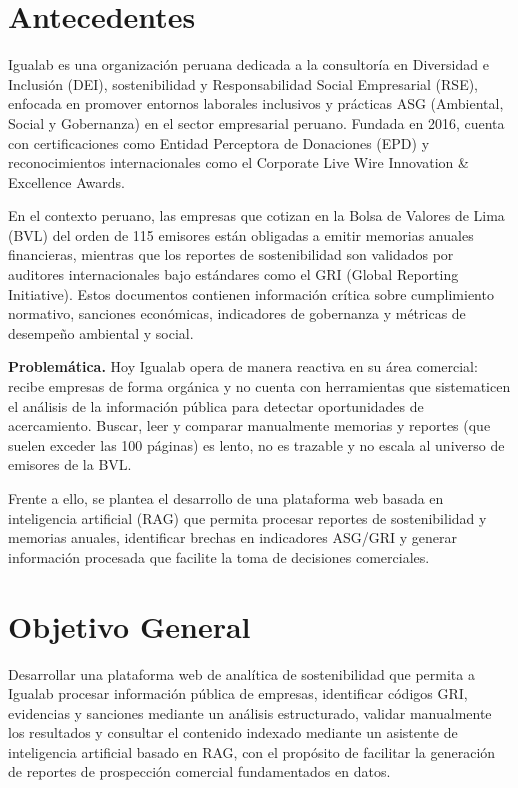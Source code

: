 
\section{Antecedentes}
Igualab es una organización peruana dedicada a la consultoría en Diversidad e Inclusión (DEI), sostenibilidad y Responsabilidad Social Empresarial (RSE), enfocada en promover entornos laborales inclusivos y prácticas ASG (Ambiental, Social y Gobernanza) en el sector empresarial peruano. Fundada en 2016, cuenta con certificaciones como Entidad Perceptora de Donaciones (EPD) y reconocimientos internacionales como el Corporate Live Wire Innovation \& Excellence Awards.

En el contexto peruano, las empresas que cotizan en la Bolsa de Valores de Lima (BVL) del orden de 115 emisores están obligadas a emitir memorias anuales financieras, mientras que los reportes de sostenibilidad son validados por auditores internacionales bajo estándares como el GRI (Global Reporting Initiative). Estos documentos contienen información crítica sobre cumplimiento normativo, sanciones económicas, indicadores de gobernanza y métricas de desempeño ambiental y social.

\textbf{Problemática.} Hoy Igualab opera de manera reactiva en su área comercial: recibe empresas de forma orgánica y no cuenta con herramientas que sistematicen el análisis de la información pública para detectar oportunidades de acercamiento. Buscar, leer y comparar manualmente memorias y reportes (que suelen exceder las 100 páginas) es lento, no es trazable y no escala al universo de emisores de la BVL.

Frente a ello, se plantea el desarrollo de una plataforma web basada en inteligencia artificial (RAG) que permita procesar reportes de sostenibilidad y memorias anuales, identificar brechas en indicadores ASG/GRI y generar información procesada que facilite la toma de decisiones comerciales.

\section{Objetivo General}
Desarrollar una plataforma web de analítica de sostenibilidad que permita a Igualab procesar información pública de empresas, identificar códigos GRI, evidencias y sanciones mediante un análisis estructurado, validar manualmente los resultados y consultar el contenido indexado mediante un asistente de inteligencia artificial basado en RAG, con el propósito de facilitar la generación de reportes de prospección comercial fundamentados en datos.

